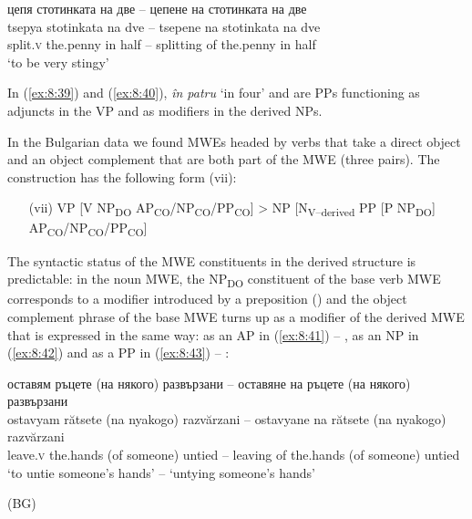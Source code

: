 \documentclass[output=paper]{langsci/langscibook}
\begin{document}
\begin{exe}
\ex \label{ex:8:40}
\settowidth{}
\glll цепя стотинката на две -- цепене на стотинката на две\\
tsepya stotinkata na dve -- tsepene na stotinkata na dve\\
split.\textsc{v} {the.penny} in half -- splitting of {the.penny} in half\\ 
\glt ‘to be very stingy’
\end{exe}


In (\ref{ex:8:39}) and (\ref{ex:8:40}), \textit{în patru} `in four' and   are PPs functioning as
adjuncts in the VP and as modifiers in the derived NPs.



In the Bulgarian data we found MWEs headed by verbs that take a direct
object and an object complement that are both part of the MWE (three
pairs). The construction has the following form (vii):


\renewcommand{\theenumi}{(\roman{enumi})}%
\begin{enumerate}
 \setcounter{enumi}{6}
\item[(vii)] VP [V NP\textsubscript{DO
}AP\textsubscript{CO}/NP\textsubscript{CO}/PP\textsubscript{CO}] > NP
[N\textsubscript{V–derived} PP [P NP\textsubscript{DO}]
AP\textsubscript{CO}/\linebreak NP\textsubscript{CO}/PP\textsubscript{CO}]
\end{enumerate}


The syntactic status of the MWE constituents in the derived structure is
predictable: in the noun MWE, the NP\textsubscript{DO }constituent of
the base verb MWE corresponds to a modifier introduced by a preposition
()  and the object complement phrase of the base MWE turns up as a
modifier of the derived MWE that is expressed in the same way: as an AP
in (\ref{ex:8:41}) – , as an NP in (\ref{ex:8:42}) 
and as a PP in (\ref{ex:8:43}) – 
:

\noindent\begin{minipage}[t]{\linewidth-3em}%
\begin{exe}
\ex \label{ex:8:41}
\settowidth{}
\glll оставям ръцете \textnormal{(}на някого\textnormal{)} развързани – оставяне на ръцете \textnormal{(}на някого\textnormal{)} развързани\\
ostavyam rătsete (na nyakogo) razvărzani -- ostavyane na
rătsete (na nyakogo) razvărzani\\
leave.\textsc{v} the.hands (of someone) untied -- leaving of the.hands (of someone) untied\\ %
\glt ‘to untie someone’s hands’ -- ‘untying someone's hands’
\end{exe}
\end{minipage}%
\hfill
\noindent\begin{minipage}[t]{2em}%
\vspace*{0.15\baselineskip}
(BG)
\end{minipage}
\end{document}
